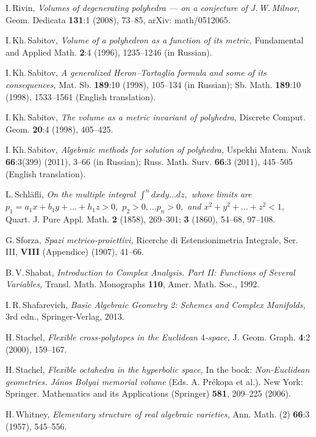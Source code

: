 \documentclass[reqno,tbtags,12pt]{amsart}
\numberwithin{equation}{section}
\theoremstyle{definition}
\begin{document}
\begin{thebibliography}{99}
 I.\,Rivin, \textit{Volumes of degenerating polyhedra --- on a conjecture of J.\,W.\,Milnor,} 
Geom. Dedicata \textbf{131}:1 (2008), 73--85, arXiv: math/0512065.

 I.\,Kh.\,Sabitov, \textit{Volume of a polyhedron as a function of its metric,} Fundamental and Applied Math. \textbf{2}:4 (1996), 1235--1246 (in Russian). 

 I.\,Kh.\,Sabitov, \textit{A generalized Heron--Tartaglia formula and some of its consequences,} Mat. Sb. \textbf{189}:10 (1998), 105--134 (in Russian); Sb. Math. \textbf{189}:10 (1998), 1533--1561 (English translation).

 I.\,Kh.\,Sabitov, \textit{The volume  as a  metric invariant of polyhedra,} Discrete Comput. Geom. \textbf{20}:4 (1998), 405--425. 

 I.\,Kh.\,Sabitov, \textit{Algebraic methods for solution of polyhedra,} Uspekhi Matem. Nauk \textbf{66}:3(399) (2011), 3--66 (in Russian); Russ. Math. Surv. \textbf{66}:3 (2011), 445--505 (English translation).

 L.\,Schl\"afli, \textit{On the multiple integral $\int^n dxdy\ldots dz,$ whose limits are $p_1=a_1x+b_1y+\ldots+h_1z>0,$ $p_2>0,\ldots p_n>0,$ and $x^2+y^2+\ldots+z^2<1,$} Quart. J. Pure Appl. Math. \textbf{2} (1858), 269--301; \textbf{3} (1860), 54--68, 97--108.

 G.\,Sforza, \textit{Spazi metrico-proiettivi,} Ricerche di Estensionimetria Integrale, Ser. III, \textbf{VIII} (Appendice) (1907), 41--66.


 B.\,V.\,Shabat, \textit{Introduction to Complex Analysis. Part II: Functions of Several Variables,} Transl. Math. Monographs \textbf{110}, Amer. Math. Soc., 1992.


 I.\,R.\,Shafarevich, \textit{Basic Algebraic Geometry 2: Schemes and Complex Manifolds,} 3rd edn., Springer-Verlag, 2013.

 H.\,Stachel, \textit{Flexible cross-polytopes in the Euclidean $4$-space,} J. Geom. Graph. \textbf{4}:2 (2000), 159--167.

 H.\,Stachel, \textit{Flexible octahedra in the hyperbolic space,} In the book: \textit{Non-Euclidean geometries. J\'anos Bolyai memorial volume\/} (Eds. A. Pr\'ekopa et al.). New York: Springer. Mathematics and its Applications (Springer) \textbf{581}, 209--225 (2006).

 H.\,Whitney, \textit{Elementary structure of real algebraic varieties,} Ann. Math. (2) \textbf{66}:3 (1957), 545--556.


\end{thebibliography}
\end{document}
